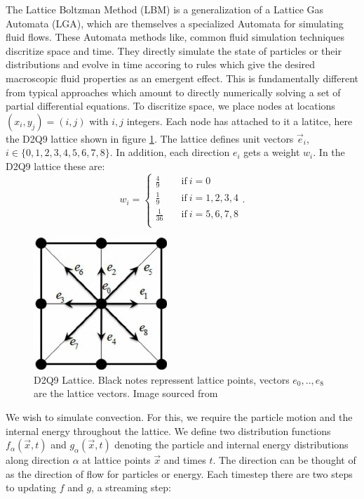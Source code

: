 \documentclass{article}
\begin{document}
\noindent The Lattice Boltzman Method (LBM) is a generalization of a Lattice Gas Automata (LGA), which are themselves a 
specialized Automata for simulating fluid flows. These Automata methods like, common fluid simulation techniques 
discritize space and time. They directly simulate the state of particles or their distributions and evolve in time 
accoring to rules which give the desired macroscopic fluid properties as an emergent effect. This is fundamentally 
different from typical approaches which amount to directly numerically solving a set of partial differential equations.
\newline
\noindent To discritize space, we place nodes at locations $(x_i,y_j)=(i,j)$ with $i,j$ integers. Each node has attached to it a latitce, here the D2Q9 lattice shown in figure \ref{D2Q9}. The lattice defines unit vectors $\vec{e}_i$, $i \in \{ 0,1,2,3,4,5,6,7,8 \}$. In addition, each direction $e_i$ gets a weight $w_i$. In the D2Q9 lattice these are:
\begin{equation*}
w_i = \begin{cases}
          \frac{4}{9} \quad &\text{if}  \ i=0 \\
          \frac{1}{9} \quad &\text{if} \ i=1,2,3,4 \\
          \frac{1}{36} \quad &\text{if} \ i=5,6,7,8 \\
     \end{cases}.
\end{equation*}
\begin{figure}[h!]
	\centering
	\includegraphics{D2Q9Lattice.jpg}
	\caption{D2Q9 Lattice. Black notes repressent lattice points, vectors $e_0,..,e_8$ are the lattice vectors. Image sourced from \cite{khazaeli2015ghost}}
	\label{D2Q9}
\end{figure}
\noindent We wish to simulate convection. For this, we require the particle motion and the internal energy throughout the lattice. We define two distribution functions $f_{\alpha}(\vec{x}, t)$ and $g_{\alpha}(\vec{x}, t)$ denoting the particle and internal energy distributions along direction $\alpha$ at lattice points $\vec{x}$ and times $t$. The direction can be thought of as the direction of flow for particles or energy. Each timestep there are two steps to updating $f$ and $g$, a streaming step:
\end{document}
